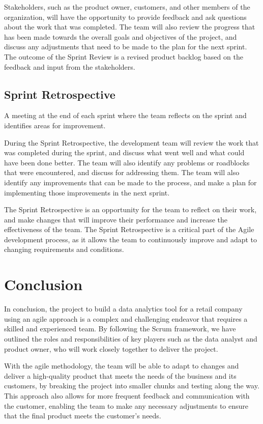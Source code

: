 \documentclass[a4paper,12pt]{article}
\begin{document}
 Stakeholders, such as the product owner, customers, and other members of the organization, will have the opportunity to provide feedback and ask questions about the work that was completed.
 The team will also review the progress that has been made towards the overall goals and objectives of the project, and discuss any adjustments that need to be made to the plan for the next sprint.
 The outcome of the Sprint Review is a revised product backlog based on the feedback and input from the stakeholders.
 
\subsection{Sprint Retrospective}
A meeting at the end of each sprint where the team reflects on the sprint and identifies areas for improvement.

During the Sprint Retrospective, the development team will review the work that was completed during the sprint, and discuss what went well and what could have been done better.
The team will also identify any problems or roadblocks that were encountered, and discuss  for addressing them.
The team will also identify any improvements that can be made to the process, and make a plan for implementing those improvements in the next sprint.

The Sprint Retrospective is an opportunity for the team to reflect on their work, and make changes that will improve their performance and increase the effectiveness of the team.
The Sprint Retrospective is a critical part of the Agile development process, as it allows the team to continuously improve and adapt to changing requirements and conditions.



\section{Conclusion}
In conclusion, the project to build a data analytics tool for a retail company using an agile approach is a complex and challenging endeavor that requires a skilled and experienced team.
By following the Scrum framework, we have outlined the roles and responsibilities of key players such as the data analyst and product owner, who will work closely together to deliver the project.

With the agile methodology, the team will be able to adapt to changes and deliver a high-quality product that meets the needs of the business and its customers, by breaking the project into smaller chunks and testing along the way.
This approach also allows for more frequent feedback and communication with the customer, enabling the team to make any necessary adjustments to ensure that the final product meets the customer's needs.
\end{document}
